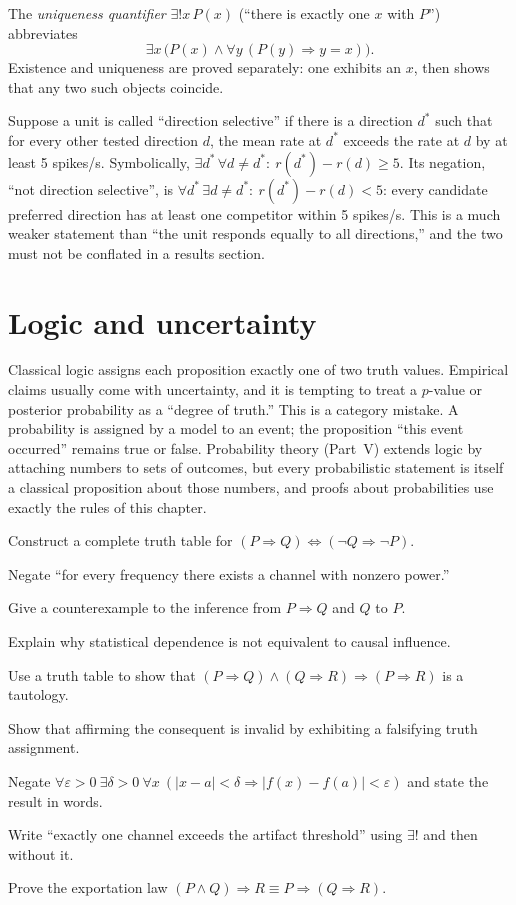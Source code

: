 The \emph{uniqueness quantifier} $\exists!x\,P(x)$ (``there is exactly one $x$ with $P$'') abbreviates
\[
\exists x\,\bigl(P(x)\land\forall y\,(P(y)\Rightarrow y=x)\bigr).
\]
Existence and uniqueness are proved separately: one exhibits an $x$, then shows that any two such objects coincide.

\begin{workedexample}
Suppose a unit is called ``direction selective'' if there is a direction $d^\ast$ such that for every other tested direction $d$, the mean rate at $d^\ast$ exceeds the rate at $d$ by at least 5 spikes/s. Symbolically, $\exists d^\ast\,\forall d\ne d^\ast:\ r(d^\ast)-r(d)\ge5$. Its negation, ``not direction selective'', is $\forall d^\ast\,\exists d\ne d^\ast:\ r(d^\ast)-r(d)<5$: every candidate preferred direction has at least one competitor within 5 spikes/s. This is a much weaker statement than ``the unit responds equally to all directions,'' and the two must not be conflated in a results section.
\end{workedexample}

\section{Logic and uncertainty}
Classical logic assigns each proposition exactly one of two truth values. Empirical claims usually come with uncertainty, and it is tempting to treat a $p$-value or posterior probability as a ``degree of truth.'' This is a category mistake. A probability is assigned by a model to an event; the proposition ``this event occurred'' remains true or false. Probability theory (Part~V) extends logic by attaching numbers to sets of outcomes, but every probabilistic statement is itself a classical proposition about those numbers, and proofs about probabilities use exactly the rules of this chapter.
\begin{exercises}
\item Construct a complete truth table for $(P\Rightarrow Q)\Leftrightarrow(\neg Q\Rightarrow\neg P)$.
\item Negate ``for every frequency there exists a channel with nonzero power.''
\item Give a counterexample to the inference from $P\Rightarrow Q$ and $Q$ to $P$.
\item Explain why statistical dependence is not equivalent to causal influence.
\item Use a truth table to show that $(P\Rightarrow Q)\land(Q\Rightarrow R)\Rightarrow(P\Rightarrow R)$ is a tautology.
\item Show that affirming the consequent is invalid by exhibiting a falsifying truth assignment.
\item Negate $\forall\varepsilon>0\ \exists\delta>0\ \forall x\ (|x-a|<\delta\Rightarrow|f(x)-f(a)|<\varepsilon)$ and state the result in words.
\item Write ``exactly one channel exceeds the artifact threshold'' using $\exists!$ and then without it.
\item Prove the exportation law $(P\land Q)\Rightarrow R\equiv P\Rightarrow(Q\Rightarrow R)$.
\end{exercises}
